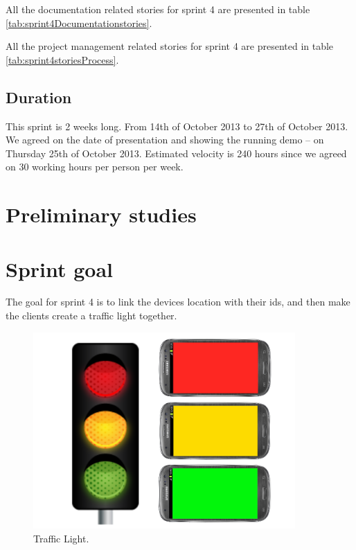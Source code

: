 All the documentation related stories for sprint 4 are presented in table \ref{tab:sprint4Documentationstories}.

All the project management related stories for sprint 4 are presented in table \ref{tab:sprint4storiesProcess}.



\subsection{Duration}
This sprint is 2 weeks long. From 14th of October 2013 to 27th of October 2013. We agreed
on the date of presentation and showing the running demo – on Thursday 25th of October 2013.
Estimated velocity is 240 hours since we agreed on 30 working hours per person per week.

\section{Preliminary studies}
\section{Sprint goal}

The goal for sprint 4 is to link the devices location with their ids, and then make the clients create a traffic light together. 
\begin{figure}[H]
	\centering
		\includegraphics[width=10cm]{sprint4/trafficlight.png}
	\caption{Traffic Light.}
	\label{fig:trafficlight }
\end{figure}

